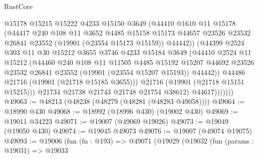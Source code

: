 \begin{lexlean}{RustCore}
\begin{coremodule}
                      @15178
                      @15215
                      @15222
                      @4233
                      @15150
                      @3649
                      (@44410
                        @1610
                        @11
                        @15178
                        (@44417
                          @240
                          @108
                          @11
                          @3652
                          @4485
                          @15158
                          @15173
                          @44657
                          @23526
                          @23532
                          @26841
                          @23552
                          (@19901 (@23554 @15173 @15159))
                          @44442))
                      (@44399
                        @2524
                        @303
                        @11
                        @30
                        @15212
                        @3655
                        @3746
                        @4233
                        @15184
                        @3649
                        (@44410
                          @2524
                          @11
                          @15212
                          (@44460
                            @240
                            @108
                            @11
                            @11505
                            @4485
                            @15192
                            @15207
                            @44692
                            @23526
                            @23532
                            @26841
                            @23552
                            (@19901 (@23554 @15207 @15193))
                            @44442))
                        @44486
                        @21716
                        (@19901 (@21718 @15185 @3655)))
                      @21716
                      (@19901 (@21718 @15151 @15215)))
                    @21734
                    @21738
                    @21743
                    @21748
                    @21754
                    @38612)
                  @44617)))))))
@49063 := @48213 (@48238 (@48279 (@48281 (@48283 @49058))))
@49064 := @18990 @430
@49068 := @18992 (@18996 @430) (@19002 @430)
@49069 := @19011 @34223
@49071 := @19007 (@49069 @19026)
@49073 := @19049 (@19050 @430)
@49074 := @19045 @49073
@49076 := @19007 (@49074 @19075)
@49093 := @19006
    (fun (fn : @193) =>
    @49071
      (@19029
        (@19032
          (fun (params : @19031) =>
          @19033

\end{coremodule}
\end{lexlean}
